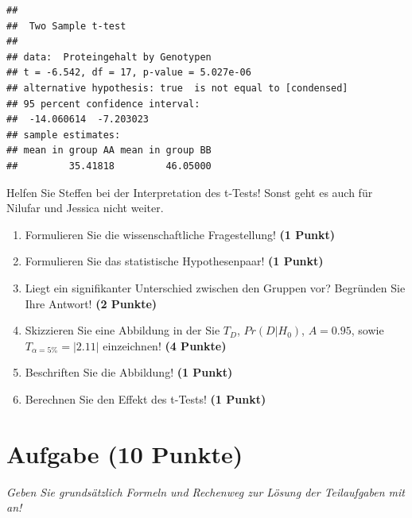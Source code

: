 \documentclass[a4paper, 9pt]{scrartcl}\usepackage[]{graphicx}\usepackage[]{xcolor}
\makeatletter
\newenvironment{kframe}{%
 \def\at@end@of@kframe{}%
 \ifinner\ifhmode%
  \def\at@end@of@kframe{\end{minipage}}%
  \begin{minipage}{\columnwidth}%
 \fi\fi%
 \def\FrameCommand##1{\hskip\@totalleftmargin \hskip-\fboxsep
 \colorbox{shadecolor}{##1}\hskip-\fboxsep
     \hskip-\linewidth \hskip-\@totalleftmargin \hskip\columnwidth}%
 \MakeFramed {\advance\hsize-\width
   \@totalleftmargin\z@ \linewidth\hsize
   \@setminipage}}%
 {\par\unskip\endMakeFramed%
 \at@end@of@kframe}
\newenvironment{knitrout}{}{} %
\makeatother
\begin{document}
\begin{knitrout}
\color{fgcolor}\begin{kframe}
\begin{verbatim}
## 
## 	Two Sample t-test
## 
## data:  Proteingehalt by Genotypen
## t = -6.542, df = 17, p-value = 5.027e-06
## alternative hypothesis: true  is not equal to [condensed]
## 95 percent confidence interval:
##  -14.060614  -7.203023
## sample estimates:
## mean in group AA mean in group BB 
##         35.41818         46.05000
\end{verbatim}
\end{kframe}
\end{knitrout}

Helfen Sie Steffen bei der Interpretation des t-Tests! Sonst geht es auch für Nilufar und Jessica nicht weiter.
  
\begin{enumerate}
  \item Formulieren Sie die wissenschaftliche Fragestellung! \textbf{(1 Punkt)}
  \item Formulieren Sie das statistische Hypothesenpaar! \textbf{(1 Punkt)}
\item Liegt ein signifikanter Unterschied zwischen den Gruppen vor? Begründen Sie Ihre Antwort! \textbf{(2 Punkte)}
\item Skizzieren Sie eine Abbildung in der Sie $T_{D}$, $Pr(D|H_0)$, $A=0.95$, sowie $T_{\alpha=5\%} = |2.11|$ einzeichnen! \textbf{(4 Punkte)}
\item Beschriften Sie die Abbildung! \textbf{(1 Punkt)}  
\item Berechnen Sie den Effekt des t-Tests! \textbf{(1 Punkt)}
\end{enumerate} 
\clearpage

\section{Aufgabe \hfill (10 Punkte)}

\textit{Geben Sie grundsätzlich Formeln und Rechenweg zur Lösung der Teilaufgaben mit an!} \\[1Ex]
 
\end{document}
